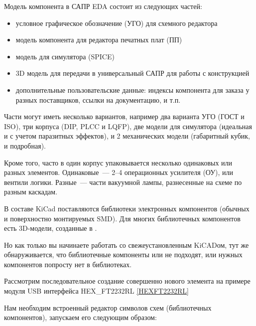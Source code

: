\secdown

\bigskip

Модель компонента в САПР EDA состоит из следующих частей:

\begin{itemize}
  \item условное графическое обозначение (УГО) для схемного редактора
  \item модель компонента для редактора печатных плат (ПП)
  \item модель для симулятора (SPICE)
  \item 3D модель для передачи в универсальный САПР для работы с конструкцией
  \item дополнительные пользовательские данные: индексы компонента для
  заказа у разных поставщиков, ссылки на документацию, и т.п.
\end{itemize}

Части могут иметь несколько вариантов, например два варианта УГО (ГОСТ и ISO),
три корпуса (DIP, PLCC и LQFP), две модели для симулятора (идеальная и с
учетом паразитных эффектов), и 2 механических модели (габаритный кубик, и
подробная).

Кроме того, часто в один корпус упаковывается несколько одинаковых или разных
элементов. Одинаковые\ --- 2--4 операционных усилителя (ОУ), или вентили
логики. Разные\ --- части вакуумной лампы, разнесенные на схеме по разным
каскадам.

\bigskip

В составе KiCad поставляются библиотеки электронных компонентов (обычных и
поверхностно монтируемых SMD). Для многих библиотечных компонентов есть
3D-модели, созданные в .

Но как только вы начинаете работать со свежеустановленным KiCADом, тут же
обнаруживается, что библиотечные компоненты или не подходят, или нужных компонентов попросту
нет в библиотеках.

Рассмотрим последовательное создание совершенно нового элемента на примере
модуля USB интерфейса HEX\_FT2232RL \ref{HEXFT2232RL}


Нам необходим встроенный редактор символов схем (библиотечных компонентов),
запускаем его следующим образом:

